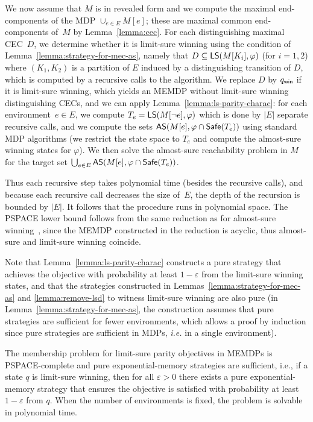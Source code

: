 \documentclass[a4paper,USenglish,cleveref, autoref, thm-restate]{lipics-v2021}
\let\epsilon\varepsilon
\def\abs#1{\ensuremath{\lvert #1 \rvert}}
\newcommand\almostsure{\textrm{\sf AS}}
\newcommand\limitsure{\textrm{\sf LS}}
\newcommand\Safe{\textrm{\sf Safe}}
\def\winabsorb{q_{\sf win}}
\begin{document}
We now assume that $M$ is in revealed form and 
we compute the maximal end-components of the MDP $\cup_{e \in E} M[e]$; 
these are maximal common end-components of~$M$ by Lemma~\ref{lemma:cec}.
For each distinguishing maximal CEC~$D$,
we determine whether it is limit-sure winning 
using the condition of Lemma~\ref{lemma:strategy-for-mec-as},
namely that $D \subseteq \limitsure(M[K_i], \varphi)$ (for $i=1,2$)
where $(K_1,K_2)$ is a partition of $E$ induced by a 
distinguishing transition of $D$, which is computed
by a recursive calls to the algorithm.
We replace $D$ by $\winabsorb$ if it is limit-sure winning,
which yields an MEMDP without limit-sure winning distinguishing CECs,
and we can apply Lemma~\ref{lemma:ls-parity-charac}:
for each environment~$e \in E$, we compute $T_e = \limitsure(M[\lnot e], \varphi)$ which is done by
$\abs{E}$ separate recursive calls, and we compute the sets 
$\almostsure(M[e], \varphi \cap \Safe(T_e))$ using standard MDP algorithms
(we restrict the state space to $T_e$ and compute the almost-sure winning states for $\varphi$).
We then solve the almost-sure reachability problem in $M$ for the target set 
$\bigcup_{e\in E}\almostsure(M[e], \varphi \cap \Safe(T_e))$.

Thus each recursive step takes polynomial time (besides the recursive calls), 
and because each recursive call decreases the size of~$E$,
the depth of the recursion is bounded by $\abs{E}$.
It follows that the procedure runs in polynomial space.
The PSPACE lower bound follows from the same reduction as for 
almost-sure winning~\cite[Theorem~7]{SVJ24}, since the MEMDP constructed in the reduction
is acyclic, thus almost-sure and limit-sure winning coincide.

Note that Lemma~\ref{lemma:ls-parity-charac}
constructs a pure strategy that achieves the objective with probability at least $1-\epsilon$
from the limit-sure winning states, and that the strategies constructed in
Lemmas~\ref{lemma:strategy-for-mec-as} and \ref{lemma:remove-lsd} to witness
limit-sure winning are also pure (in Lemma~\ref{lemma:strategy-for-mec-as},
the construction assumes that pure strategies are sufficient for fewer environments, 
which allows a proof by induction since pure strategies are sufficient in MDPs, \textit{i.e.} in a single environment).

\begin{theorem}
	\label{thm:ls-parity}
	The membership problem for limit-sure parity objectives in MEMDPs is PSPACE-complete and 
	pure exponential-memory strategies are sufficient, i.e., if a state $q$ is limit-sure winning, then for all $\epsilon >0$
	there exists a pure exponential-memory strategy that ensures the objective is satisfied with probability at least $1-\epsilon$
	from $q$.
	When the number of environments is fixed, the problem is solvable in polynomial time.
\end{theorem}
\end{document}
